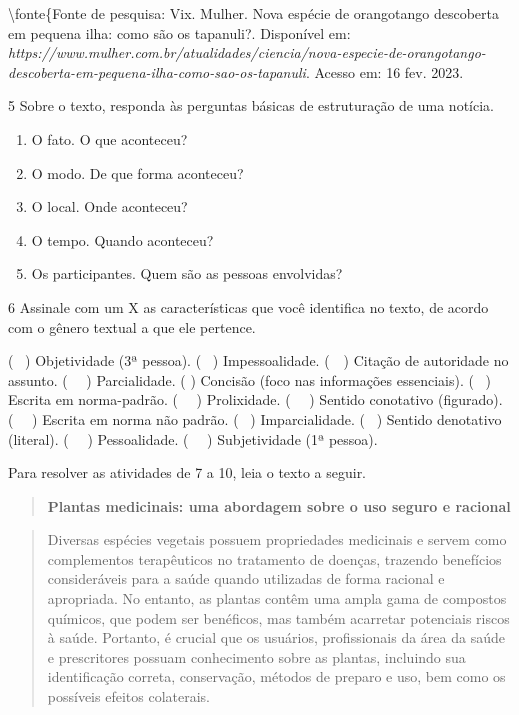 \textbackslash fonte\{Fonte de pesquisa: Vix. Mulher. Nova espécie de
orangotango descoberta em pequena ilha: como são os tapanuli?.
Disponível em:
\emph{https://www.mulher.com.br/atualidades/ciencia/nova-especie-de-orangotango-descoberta-em-pequena-ilha-como-sao-os-tapanuli}.
Acesso em: 16 fev. 2023.

\num{5} Sobre o texto, responda às perguntas básicas de estruturação de
uma notícia.

\begin{enumerate}
\def\labelenumi{\alph{enumi})}
\item
  O fato. O que aconteceu? 
\item
  O modo. De que forma aconteceu? 
\item
  O local. Onde aconteceu? 
\item
  O tempo. Quando aconteceu?  
\item
  Os participantes. Quem são as pessoas envolvidas? 
\end{enumerate}

\num{6} Assinale com um X as características que você identifica no
texto, de acordo com o gênero textual a que ele pertence.

(~ ) Objetividade (3ª pessoa). (~ ) Impessoalidade.
(~~) Citação de autoridade no assunto. (~~ ) Parcialidade. (
 ) Concisão (foco nas informações essenciais). (~ )
Escrita em norma-padrão. (~~ ) Prolixidade. (~~ ) Sentido conotativo
(figurado). (~~ ) Escrita em norma não padrão. (~ )
Imparcialidade. (~ ) Sentido denotativo (literal). (~~ )
Pessoalidade. (~~ ) Subjetividade (1ª pessoa).

Para resolver as atividades de 7 a 10, leia o texto a seguir.

\begin{quote}
\textbf{Plantas medicinais: uma abordagem sobre o uso seguro e racional}
\end{quote}

\begin{quote}
Diversas espécies vegetais possuem propriedades medicinais e servem como
complementos terapêuticos no tratamento de doenças, trazendo benefícios
consideráveis para a saúde quando utilizadas de forma racional e
apropriada. No entanto, as plantas contêm uma ampla gama de compostos
químicos, que podem ser benéficos, mas também acarretar potenciais
riscos à saúde. Portanto, é crucial que os usuários, profissionais da
área da saúde e prescritores possuam conhecimento sobre as plantas,
incluindo sua identificação correta, conservação, métodos de preparo e
uso, bem como os possíveis efeitos colaterais.
\end{quote}

